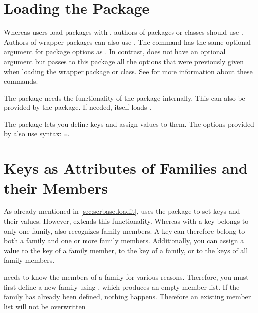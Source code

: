 \section{Loading the Package}

Whereas users load packages with , authors of packages or
classes should use . Authors of
wrapper packages can also use . The
 command has the same optional argument for package
options as . In contrast, 
does not have an optional argument but passes to this package all the options
that were previously given when loading the wrapper package or class. See
\cite{latex:clsguide} for more information about these commands.

The  package needs the functionality of the
 package internally. This can also be
provided by the  package. If needed,  itself
loads .

The  package lets you define keys and assign values to them.
The options provided by  also use  syntax:
\texttt{=}.


\section{Keys as Attributes of Families and their Members}

As already mentioned in \autoref{sec:scrbase.loadit},  uses
the  package to set keys and their values. However,
 extends this functionality. Whereas with  a
key belongs to only one family,  also recognizes family
members. A key can therefore belong to both a family and one or more family
members. Additionally, you can assign a value to the key of a family member,
to the key of a family, or to the keys of all family members.

\begin{Declaration}
\end{Declaration}
 needs to know the members of a family for various reasons.
Therefore, you must first define a new family using ,
which produces an empty member list. If the family has already been defined,
nothing happens. Therefore an existing member list will not be overwritten.

